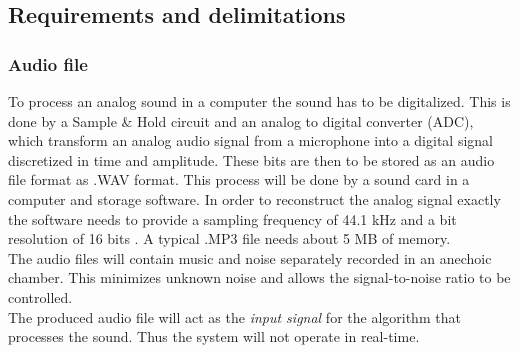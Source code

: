 \subsection{Requirements and delimitations}
\subsubsection{Audio file}
To process an analog sound in a computer the sound has to be digitalized. This is done by a Sample \& Hold circuit and an analog to digital converter (ADC), which transform an analog audio signal from a microphone into a digital signal discretized in time and amplitude. These bits are then to be stored as an audio file format as .WAV format. This process will be done by a sound card in a computer and storage software. In order to reconstruct the analog signal exactly the software needs to provide a sampling frequency of 44.1 kHz and a bit resolution of 16 bits \cite{Mic}. A typical .MP3 file needs about 5 MB of memory. \\
The audio files will contain music and noise separately recorded in an anechoic chamber. This minimizes unknown noise and allows the signal-to-noise ratio to be controlled. \\      
The produced audio file will act as the \textit{input signal} for the algorithm that processes the sound. Thus the system will not operate in real-time. 

